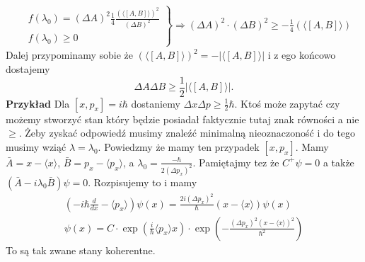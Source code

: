 \begin{align*}
	&\left.
	\begin{aligned}
		f(\lambda_0)  = (\Delta A)^2 \frac{1}{4} \frac{(\langle[A, B]\rangle)^2}{(\Delta B)^2} \\
		f(\lambda_0) \geq 0
	\end{aligned}
	\right\}
	\Rightarrow (\Delta A)^2 \cdot (\Delta B)^2 \geq -\frac14(\langle[A, B]\rangle)
\end{align*}
Dalej przypominamy sobie że $(\langle[A, B]\rangle)^2 = -| \langle[A, B]\rangle |$ i z ego końcowo dostajemy $$\Delta A \Delta B \geq \frac12 |\langle [A, B] \rangle|.$$
\textbf{Przykład} Dla $[x, p_x] = i \hbar$ dostaniemy $\Delta x \Delta p \geq \frac12 \hbar$.
Ktoś może zapytać czy możemy stworzyć stan który będzie posiadał faktycznie tutaj znak równości a nie $\geq$. 
Żeby zyskać odpowiedź musimy znaleźć minimalną nieoznaczoność i do tego musimy wziąć $\lambda = \lambda_0$. 
Powiedzmy że mamy ten przypadek $[x, p_x]$. Mamy $\bar{A} = x - \langle x \rangle$, $\bar{B} = p_x - \langle p_x \rangle$, a $\lambda_0 = \frac{-\hbar}{2(\Delta p_x)^2}$. 
Pamiętajmy tez że $C^+ \psi = 0$ a także $(\bar{A} - i \lambda_0 \bar{B})\psi = 0$. Rozpisujemy to i mamy
\begin{equation*}
	\begin{split}
		\left(-i \hbar \frac{d}{dx} - \langle p_x \rangle \right)\psi(x) = \frac{2i(\Delta p_x)^2}{\hbar} (x - \langle x \rangle) \psi(x) \\
		\psi(x) = C \cdot \exp \left(\frac{i}{\hbar}\langle p_x \rangle x\right) \cdot \exp \left( - \frac{(\Delta p_x)^2 (x - \langle x \rangle)^2}{\hbar^2} \right)
	\end{split}
\end{equation*}
To są tak zwane stany koherentne. 
